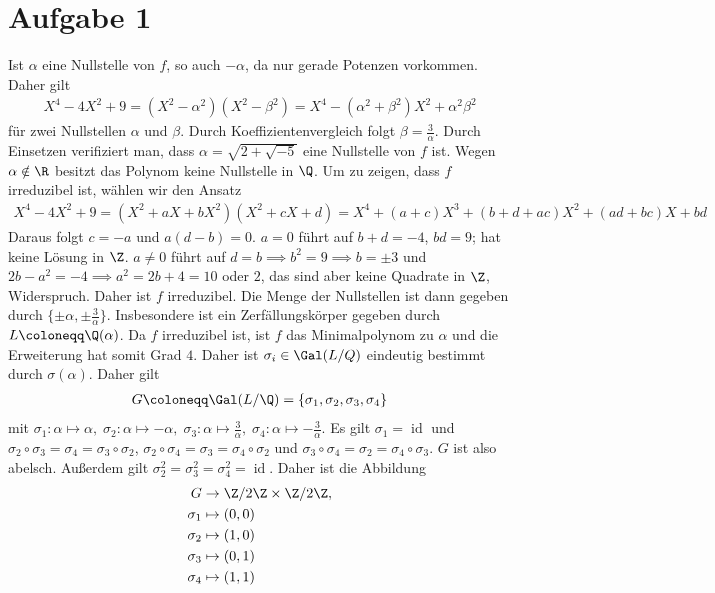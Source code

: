 \documentclass{article}
\newcommand{\id}{\operatorname{id}}
\begin{document}
\def\headheight{25pt}
    \section*{Aufgabe 1}
    Ist $\alpha$ eine Nullstelle von $f$, so auch $-\alpha$, da nur gerade Potenzen vorkommen. Daher gilt
    \begin{align*}
        X^4 - 4X^2 + 9 = (X^2 - \alpha^2)(X^2 - \beta^2) = X^4 - (\alpha^2 + \beta^2)X^2 + \alpha^2\beta^2
    \end{align*}
    für zwei Nullstellen $\alpha$ und $\beta$. Durch Koeffizientenvergleich folgt $\beta = \frac{3}{\alpha}$.
    Durch Einsetzen verifiziert man, dass $\alpha = \sqrt{2 + \sqrt{-5}}$ eine Nullstelle von $f$ ist.
    Wegen $\alpha \notin \R$ besitzt das Polynom keine Nullstelle in $\Q$. 
    Um zu zeigen, dass $f$ irreduzibel ist, wählen wir den Ansatz
    \begin{align*}
        X^4 - 4X^2 + 9 = (X^2 + aX + bX^2)(X^2 + cX + d) = X^4 + (a + c)X^3 + (b + d + ac)X^2 + (ad + bc)X + bd
    \end{align*}
    Daraus folgt $c = -a$ und $a(d-b) = 0$. $a = 0$ führt auf $b +d = -4$, $bd = 9$; hat keine Lösung in $\Z$.
    $a\neq 0$ führt auf $d = b \implies b^2 = 9 \implies b = \pm 3$ und $2b -a^2 = -4 \implies a^2 = 2b + 4 = 10$ oder $2$, 
    das sind aber keine Quadrate in $\Z$, Widerspruch. Daher ist $f$ irreduzibel.
    Die Menge der Nullstellen ist dann gegeben durch $\{\pm \alpha, \pm \frac{3}{\alpha}\}$.
    Insbesondere ist ein Zerfällungskörper gegeben durch $L\coloneqq \Q(\alpha)$.
    Da $f$ irreduzibel ist, ist $f$ das Minimalpolynom zu $\alpha$ und die Erweiterung hat somit Grad $4$.
    Daher ist $\sigma_i \in \Gal(L/Q)$ eindeutig bestimmt durch $\sigma(\alpha)$. Daher gilt 
    \begin{align*}
        G \coloneqq \Gal(L/\Q) = \{\sigma_1, \sigma_2, \sigma_3, \sigma_4\}
    \end{align*}
    mit $\sigma_1 \colon \alpha \mapsto \alpha,\; 
    \sigma_2 \colon \alpha \mapsto -\alpha,\; 
    \sigma_3 \colon \alpha \mapsto \frac{3}{\alpha},\; 
    \sigma_4 \colon \alpha \mapsto -\frac{3}{\alpha}$.
    Es gilt $\sigma_1 = \id$ und $\sigma_2 \circ \sigma_3 = \sigma_4 = \sigma_3 \circ \sigma_2$,
    $\sigma_2 \circ \sigma_4 = \sigma_3 = \sigma_4 \circ \sigma_2$ und
    $\sigma_3 \circ \sigma_4 = \sigma_2 = \sigma_4 \circ \sigma_3$. $G$ ist also abelsch.
    Außerdem gilt $\sigma_2^2 = \sigma_3^2 = \sigma_4^2 = \id$. Daher ist die Abbildung
    \begin{align*}
        G &\to \Z/2\Z \times \Z/2\Z,\\
        \sigma_1 &\mapsto (0,0)\\
        \sigma_2 &\mapsto (1,0)\\
        \sigma_3 &\mapsto (0,1)\\
        \sigma_4 &\mapsto (1,1)
    \end{align*}
\end{document}
